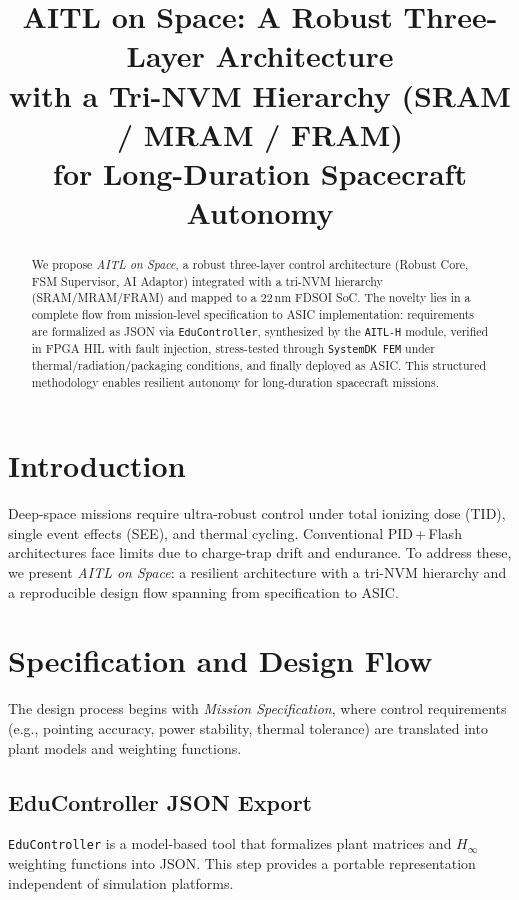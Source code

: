 \documentclass[conference]{IEEEtran}
\title{AITL on Space: A Robust Three-Layer Architecture\\
with a Tri-NVM Hierarchy (SRAM / MRAM / FRAM)\\
for Long-Duration Spacecraft Autonomy}
\author{
\IEEEauthorblockN{Shinichi Samizo}
\IEEEauthorblockA{Independent Semiconductor Researcher\\
Former Engineer at Seiko Epson Corporation\\
Email: shin3t72@gmail.com\quad GitHub: \url{https://github.com/Samizo-AITL}}
}
\begin{document}
\maketitle

\begin{abstract}
We propose \emph{AITL on Space}, a robust three-layer control architecture (Robust Core, FSM Supervisor, AI Adaptor) integrated with a tri-NVM hierarchy (SRAM/MRAM/FRAM) and mapped to a 22\,nm FD\!SOI SoC. The novelty lies in a complete flow from mission-level specification to ASIC implementation: requirements are formalized as JSON via \texttt{EduController}, synthesized by the \texttt{AITL-H} module, verified in FPGA HIL with fault injection, stress-tested through \texttt{SystemDK FEM} under thermal/radiation/packaging conditions, and finally deployed as ASIC. This structured methodology enables resilient autonomy for long-duration spacecraft missions.
\end{abstract}

\section{Introduction}
Deep-space missions require ultra-robust control under total ionizing dose (TID), single event effects (SEE), and thermal cycling. Conventional PID\,+\,Flash architectures face limits due to charge-trap drift and endurance. To address these, we present \emph{AITL on Space}: a resilient architecture with a tri-NVM hierarchy and a reproducible design flow spanning from specification to ASIC.

\section{Specification and Design Flow}
The design process begins with \emph{Mission Specification}, where control requirements (e.g., pointing accuracy, power stability, thermal tolerance) are translated into plant models and weighting functions.

\subsection{EduController JSON Export}
\texttt{EduController} is a model-based tool that formalizes plant matrices and $H_\infty$ weighting functions into JSON. This step provides a portable representation independent of simulation platforms.
\end{document}
